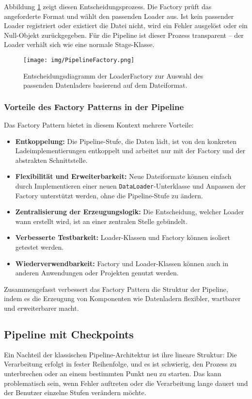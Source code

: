 \documentclass[a4paper]{article} %
\begin{document}
Abbildung \ref{fig:loaderFactory} zeigt diesen Entscheidungsprozess. Die Factory prüft das angeforderte Format und wählt den passenden Loader aus. Ist kein passender Loader registriert oder existiert die Datei nicht, wird ein Fehler ausgelöst oder ein Null-Objekt zurückgegeben. Für die Pipeline ist dieser Prozess transparent – der Loader verhält sich wie eine normale Stage-Klasse.

\begin{figure}[htbp]
    \centering
    \texttt{[image: img/PipelineFactory.png]}
    \caption{Entscheidungsdiagramm der LoaderFactory zur Auswahl des passenden Datenladers basierend auf dem Dateiformat.}
    \label{fig:loaderFactory}
\end{figure}

\subsubsection{Vorteile des Factory Patterns in der Pipeline}
Das Factory Pattern bietet in diesem Kontext mehrere Vorteile:

\begin{itemize}
    \item \textbf{Entkoppelung:} Die Pipeline-Stufe, die Daten lädt, ist von den konkreten Ladeimplementierungen entkoppelt und arbeitet nur mit der Factory und der abstrakten Schnittstelle.
    \item \textbf{Flexibilität und Erweiterbarkeit:} Neue Dateiformate können einfach durch Implementieren einer neuen \texttt{DataLoader}-Unterklasse und Anpassen der Factory unterstützt werden, ohne die Pipeline-Stufe zu ändern.
    \item \textbf{Zentralisierung der Erzeugungslogik:} Die Entscheidung, welcher Loader wann erstellt wird, ist an einer zentralen Stelle gebündelt.
    \item \textbf{Verbesserte Testbarkeit:} Loader-Klassen und Factory können isoliert getestet werden.
    \item \textbf{Wiederverwendbarkeit:} Factory und Loader-Klassen können auch in anderen Anwendungen oder Projekten genutzt werden.
\end{itemize}

Zusammengefasst verbessert das Factory Pattern die Struktur der Pipeline, indem es die Erzeugung von Komponenten wie Datenladern flexibler, wartbarer und erweiterbarer macht.

\subsection{Pipeline mit Checkpoints}
Ein Nachteil der klassischen Pipeline-Architektur ist ihre lineare Struktur: Die Verarbeitung erfolgt in fester Reihenfolge, und es ist schwierig, den Prozess zu unterbrechen oder an einem bestimmten Punkt neu zu starten. Das kann problematisch sein, wenn Fehler auftreten oder die Verarbeitung lange dauert und der Benutzer einzelne Stufen verändern möchte.
\end{document}
